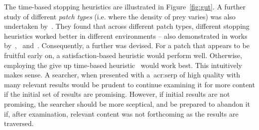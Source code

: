 The time-based stopping heuristics are illustrated in Figure~\ref{fig:gut}. A further study of different \emph{patch types} (i.e. where the density of prey varies) was also undertaken by~\cite{mcnair1982gut_mvt}. They found that across different patch types, different stopping heuristics worked better in different environments -- also demonstrated in works by~\cite{iwasa1981prey_distribution},~\cite{mcnair1982gut_mvt} and~\cite{green1984oft_stopping}. Consequently, a further  was devised. For a patch that appears to be fruitful early on, a satisfaction-based heuristic would perform well. Otherwise, employing the give up time-based heuristic~\citep{krebs1974leave_after_rule} would work best. This intuitively makes sense. A searcher, when presented with a~\gls{acr:serp} of high quality with many relevant results would be prudent to continue examining it for more content if the initial set of results are promising. However, if initial results are not promising, the searcher should be more sceptical, and be prepared to abandon it if, after examination, relevant content was not forthcoming as the results are traversed.



